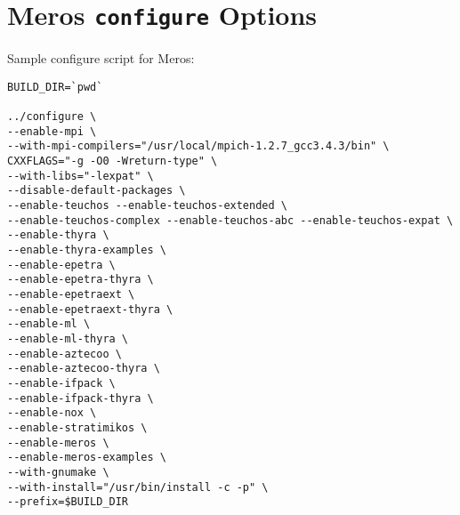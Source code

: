 \documentclass[oneeqnum,onefignum,onetabnum,10pt]{SANDreport}
\newcommand{\InlineCommand}[1]{
  {\hspace{0.01 in}} {\tt #1} {\hspace{0.01 in}}}
\begin{document}
\section{Meros \InlineCommand{configure} Options}
Sample configure script for Meros:

\begin{verbatim}
BUILD_DIR=`pwd`

../configure \
--enable-mpi \
--with-mpi-compilers="/usr/local/mpich-1.2.7_gcc3.4.3/bin" \
CXXFLAGS="-g -O0 -Wreturn-type" \
--with-libs="-lexpat" \
--disable-default-packages \
--enable-teuchos --enable-teuchos-extended \
--enable-teuchos-complex --enable-teuchos-abc --enable-teuchos-expat \
--enable-thyra \
--enable-thyra-examples \
--enable-epetra \
--enable-epetra-thyra \
--enable-epetraext \
--enable-epetraext-thyra \
--enable-ml \
--enable-ml-thyra \
--enable-aztecoo \
--enable-aztecoo-thyra \
--enable-ifpack \
--enable-ifpack-thyra \
--enable-nox \
--enable-stratimikos \
--enable-meros \
--enable-meros-examples \
--with-gnumake \
--with-install="/usr/bin/install -c -p" \
--prefix=$BUILD_DIR
\end{verbatim}



    
%
\end{document}
